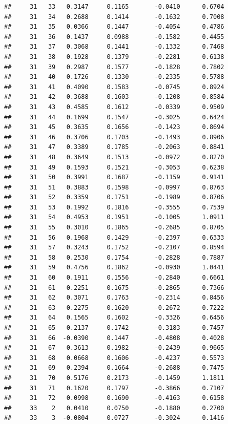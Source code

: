 \documentclass[
]{article}
\begin{document}
\begin{verbatim}
##     31   33   0.3147     0.1165       -0.0410      0.6704  
##     31   34   0.2688     0.1414       -0.1632      0.7008  
##     31   35   0.0366     0.1447       -0.4054      0.4786  
##     31   36   0.1437     0.0988       -0.1582      0.4455  
##     31   37   0.3068     0.1441       -0.1332      0.7468  
##     31   38   0.1928     0.1379       -0.2281      0.6138  
##     31   39   0.2987     0.1577       -0.1828      0.7802  
##     31   40   0.1726     0.1330       -0.2335      0.5788  
##     31   41   0.4090     0.1583       -0.0745      0.8924  
##     31   42   0.3688     0.1603       -0.1208      0.8584  
##     31   43   0.4585     0.1612       -0.0339      0.9509  
##     31   44   0.1699     0.1547       -0.3025      0.6424  
##     31   45   0.3635     0.1656       -0.1423      0.8694  
##     31   46   0.3706     0.1703       -0.1493      0.8906  
##     31   47   0.3389     0.1785       -0.2063      0.8841  
##     31   48   0.3649     0.1513       -0.0972      0.8270  
##     31   49   0.1593     0.1521       -0.3053      0.6238  
##     31   50   0.3991     0.1687       -0.1159      0.9141  
##     31   51   0.3883     0.1598       -0.0997      0.8763  
##     31   52   0.3359     0.1751       -0.1989      0.8706  
##     31   53   0.1992     0.1816       -0.3555      0.7539  
##     31   54   0.4953     0.1951       -0.1005      1.0911  
##     31   55   0.3010     0.1865       -0.2685      0.8705  
##     31   56   0.1968     0.1429       -0.2397      0.6333  
##     31   57   0.3243     0.1752       -0.2107      0.8594  
##     31   58   0.2530     0.1754       -0.2828      0.7887  
##     31   59   0.4756     0.1862       -0.0930      1.0441  
##     31   60   0.1911     0.1556       -0.2840      0.6661  
##     31   61   0.2251     0.1675       -0.2865      0.7366  
##     31   62   0.3071     0.1763       -0.2314      0.8456  
##     31   63   0.2275     0.1620       -0.2672      0.7222  
##     31   64   0.1565     0.1602       -0.3326      0.6456  
##     31   65   0.2137     0.1742       -0.3183      0.7457  
##     31   66  -0.0390     0.1447       -0.4808      0.4028  
##     31   67   0.3613     0.1982       -0.2439      0.9665  
##     31   68   0.0668     0.1606       -0.4237      0.5573  
##     31   69   0.2394     0.1664       -0.2688      0.7475  
##     31   70   0.5176     0.2173       -0.1459      1.1811  
##     31   71   0.1620     0.1797       -0.3866      0.7107  
##     31   72   0.0998     0.1690       -0.4163      0.6158  
##     33    2   0.0410     0.0750       -0.1880      0.2700  
##     33    3  -0.0804     0.0727       -0.3024      0.1416  

\end{verbatim}
\end{document}
